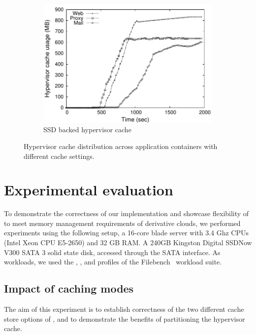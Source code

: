 \begin{figure}[t]
\begin{subfigure}{0.38\textwidth}
\includegraphics[width=\textwidth]{data/correctness/musage_global_ssd_new} 
 \caption{\dd{} SSD backed hypervisor cache}
 \label{fig:ddeckerssd} 
\vspace{-0.2cm}
\end{subfigure} 
%
\caption{Hypervisor cache distribution across application containers with
         different cache settings.}
\vspace{-0.25cm}
\label{fig:expt1}
\end{figure}

\section{Experimental evaluation}
\label{sec:expt}

To demonstrate the correctness of our implementation and 
showcase flexibility of \dd{} to meet memory management 
requirements of derivative clouds, we performed experiments 
using the following setup,
a 16-core blade server with 3.4 Ghz  CPUs (Intel Xeon CPU E5-2650)
and 32 GB RAM.
%
A 240GB Kingston Digital SSDNow V300 SATA 3 solid state disk, accessed
through the SATA interface.
%
As workloads, we used
the \web, \proxy, \mail{} and \video{} profiles of the 
Filebench~\cite{filebench} workload suite.
%  
%

\subsection{Impact of caching modes}
The aim of this experiment is to establish correctness of the
two different cache store options of \dd, and to demonstrate the
benefits of partitioning the hypervisor cache.

